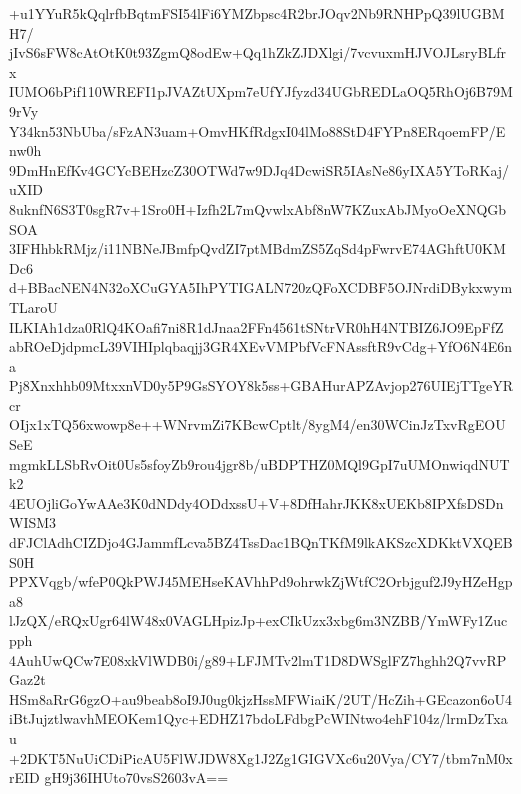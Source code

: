 +u1YYuR5kQqlrfbBqtmFSI54lFi6YMZbpsc4R2brJOqv2Nb9RNHPpQ39lUGBMH7/
jIvS6sFW8cAtOtK0t93ZgmQ8odEw+Qq1hZkZJDXlgi/7vcvuxmHJVOJLsryBLfrx
IUMO6bPif110WREFI1pJVAZtUXpm7eUfYJfyzd34UGbREDLaOQ5RhOj6B79M9rVy
Y34kn53NbUba/sFzAN3uam+OmvHKfRdgxI04lMo88StD4FYPn8ERqoemFP/Enw0h
9DmHnEfKv4GCYcBEHzcZ30OTWd7w9DJq4DcwiSR5IAsNe86yIXA5YToRKaj/uXID
8uknfN6S3T0sgR7v+1Sro0H+Izfh2L7mQvwlxAbf8nW7KZuxAbJMyoOeXNQGbSOA
3IFHhbkRMjz/i11NBNeJBmfpQvdZI7ptMBdmZS5ZqSd4pFwrvE74AGhftU0KMDc6
d+BBacNEN4N32oXCuGYA5IhPYTIGALN720zQFoXCDBF5OJNrdiDBykxwymTLaroU
ILKIAh1dza0RlQ4KOafi7ni8R1dJnaa2FFn4561tSNtrVR0hH4NTBIZ6JO9EpFfZ
abROeDjdpmcL39VIHIplqbaqjj3GR4XEvVMPbfVcFNAssftR9vCdg+YfO6N4E6na
Pj8Xnxhhb09MtxxnVD0y5P9GsSYOY8k5ss+GBAHurAPZAvjop276UIEjTTgeYRcr
OIjx1xTQ56xwowp8e++WNrvmZi7KBcwCptlt/8ygM4/en30WCinJzTxvRgEOUSeE
mgmkLLSbRvOit0Us5sfoyZb9rou4jgr8b/uBDPTHZ0MQl9GpI7uUMOnwiqdNUTk2
4EUOjliGoYwAAe3K0dNDdy4ODdxssU+V+8DfHahrJKK8xUEKb8IPXfsDSDnWISM3
dFJClAdhCIZDjo4GJammfLcva5BZ4TssDac1BQnTKfM9lkAKSzcXDKktVXQEBS0H
PPXVqgb/wfeP0QkPWJ45MEHseKAVhhPd9ohrwkZjWtfC2Orbjguf2J9yHZeHgpa8
lJzQX/eRQxUgr64lW48x0VAGLHpizJp+exCIkUzx3xbg6m3NZBB/YmWFy1Zucpph
4AuhUwQCw7E08xkVlWDB0i/g89+LFJMTv2lmT1D8DWSglFZ7hghh2Q7vvRPGaz2t
HSm8aRrG6gzO+au9beab8oI9J0ug0kjzHssMFWiaiK/2UT/HcZih+GEcazon6oU4
iBtJujztlwavhMEOKem1Qyc+EDHZ17bdoLFdbgPcWINtwo4ehF104z/lrmDzTxau
+2DKT5NuUiCDiPicAU5FlWJDW8Xg1J2Zg1GIGVXc6u20Vya/CY7/tbm7nM0xrEID
gH9j36IHUto70vsS2603vA==
